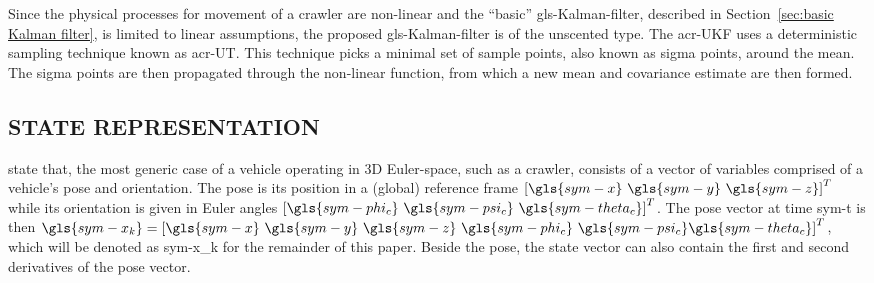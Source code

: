 Since the physical processes for movement of a crawler are non-linear and the ``basic'' \gls{gls-Kalman-filter},
described in Section~\ref{sec:basic Kalman filter}, is limited to linear assumptions, the proposed
\gls{gls-Kalman-filter} is of the unscented type. The \gls{acr-UKF} uses a deterministic sampling technique
known as \gls{acr-UT}. This technique picks a minimal set of sample points, also known as sigma points, around
the mean. The sigma points are then propagated through the non-linear function, from which a new mean and covariance
estimate are then formed.

\subsection{STATE REPRESENTATION}\label{sec:state representation}

\citet{bahr_cooperative_2009} state that, the most generic case of a vehicle operating in 3D Euler-space, such as a
crawler, consists of a vector of variables comprised of a vehicle's pose and orientation. The pose is its position in a
(global) reference frame \( \left[\gls{sym-x} ~\gls{sym-y} ~\gls{sym-z}\right]^T \) while its orientation is given in
Euler angles \( \left[\gls{sym-phi_c} ~\gls{sym-psi_c} ~\gls{sym-theta_c}\right]^T \). The pose vector at time
\gls{sym-t} is then \( \gls{sym-x_k} = \left[\gls{sym-x} ~\gls{sym-y} ~\gls{sym-z} ~\gls{sym-phi_c} ~\gls{sym-psi_c}
\gls{sym-theta_c}\right]^T \), which will be denoted as  \gls{sym-x_k} for the remainder of this paper. Beside the pose,
the state vector can also contain the first and second derivatives of the pose vector.

